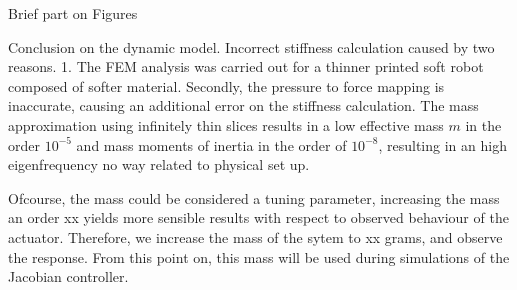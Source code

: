 Brief part on Figures



Conclusion on the dynamic model. Incorrect stiffness calculation caused by two reasons. 1. The FEM analysis was carried out for a thinner printed soft robot composed of softer material. Secondly, the pressure to force mapping is inaccurate, causing an additional error on the stiffness calculation. The mass approximation using infinitely thin slices results in a low effective mass $m$ in the order $10^{-5}$ and mass moments of inertia in the order of $10^{-8}$, resulting in an high eigenfrequency no way related to physical set up. 

Ofcourse, the mass could be considered a tuning parameter, increasing the mass an order xx yields more sensible results with respect to observed behaviour of the actuator. Therefore, we increase the mass of the sytem to xx grams, and observe the response. From this point on, this mass will be used during simulations of the Jacobian controller. 

